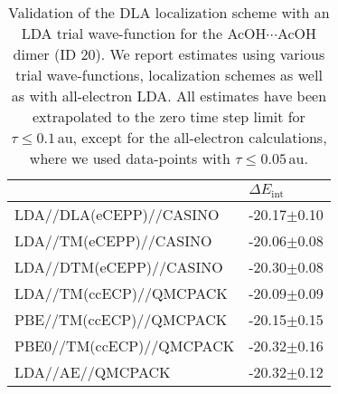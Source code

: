 \begin{table}[h!]
\caption{\label{tab:acetic_acid_validation}Validation of the DLA localization scheme with an LDA trial wave-function for the AcOH$\cdots$AcOH dimer (ID 20). We report estimates using various trial wave-functions, localization schemes as well as with all-electron LDA. All estimates have been extrapolated to the zero time step limit for $\tau{\leq}0.1\,$au, except for the all-electron calculations, where we used data-points with $\tau{\leq}0.05\,$au.}
\begin{adjustbox}{center}
\begin{tabular}{ll}
\toprule
 & $\Delta E_\text{int}$ \\ 
\midrule
LDA//DLA(eCEPP)//CASINO & -20.17$\pm$0.10 \\
LDA//TM(eCEPP)//CASINO & -20.06$\pm$0.08 \\
LDA//DTM(eCEPP)//CASINO & -20.30$\pm$0.08 \\
LDA//TM(ccECP)//QMCPACK & -20.09$\pm$0.09 \\
PBE//TM(ccECP)//QMCPACK & -20.15$\pm$0.15 \\
PBE0//TM(ccECP)//QMCPACK & -20.32$\pm$0.16 \\
LDA//AE//QMCPACK & -20.32$\pm$0.12 \\
\bottomrule
\end{tabular}
\end{adjustbox}
\end{table}